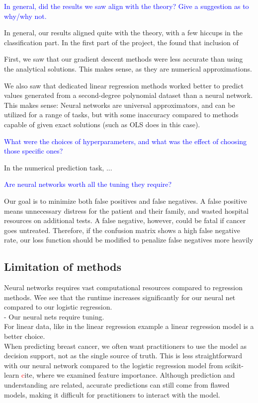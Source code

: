 \textcolor{blue}{In general, did the results we saw align with the theory? Give a suggestion as to why/why not.}

In general, our results aligned quite with the theory, with a few hiccups in the classification part. In the first part of the project, the found that inclusion of 

First, we saw that our gradient descent methods were less accurate than using the analytical solutions. This makes sense, as they are numerical approximations. 

We also saw that dedicated linear regression methods worked better to predict values generated from a second-degree polynomial dataset than a neural network. This makes sense: Neural networks are universal approximators, and can be utilized for a range of tasks, but with some inaccuracy compared to methods capable of given exact solutions (such as OLS does in this case). 

\textcolor{blue}{What were the choices of hyperparameters, and what was the effect of choosing those specific ones?}

In the numerical prediction task, ...

\textcolor{blue}{Are neural networks worth all the tuning they require?}

Our goal is to minimize both false positives and false negatives. A false positive means unnecessary distress for the patient and their family, and wasted hospital resources on additional tests. A false negative, however, could be fatal if cancer goes untreated. Therefore, if the confusion matrix shows a high false negative rate, our loss function should be modified to penalize false negatives more heavily

\subsection{Limitation of methods}
Neural networks requires vast computational resources compared to regression methods. Wee see that the runtime increases significantly for our neural net compared to our logistic regression. \\

-  Our neural nets require tuning. \\

For linear data, like in the linear regression example
a linear regression model is a better choice. 
\\
When predicting breast cancer, we often want practitioners to use the model as decision support, not as the single source of truth. This is less straightforward with our neural network compared to the logistic regression model from scikit-learn \textcolor{red} cite, where we examined feature importance. Although prediction and understanding are related, accurate predictions can still come from flawed models, making it difficult for practitioners to interact with the model.
